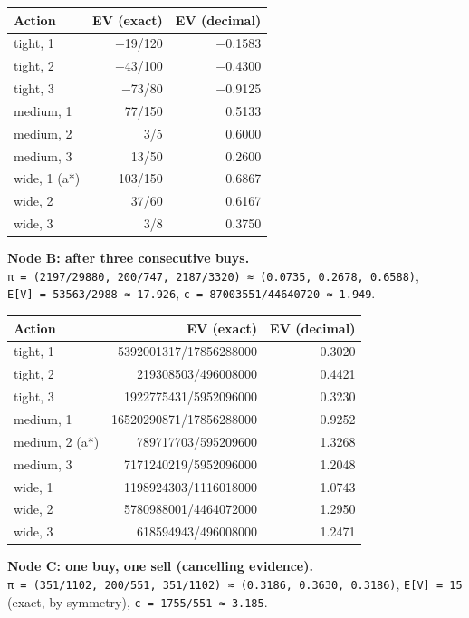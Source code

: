 \documentclass[
  11pt,
]{article}
\newcounter{none} %
\begin{document}
{\def\LTcaptype{none} %
\begin{longtable}[]{@{}lrr@{}}
\toprule\noalign{}
Action & EV (exact) & EV (decimal) \\
\midrule\noalign{}
\endhead
\bottomrule\noalign{}
\endlastfoot
tight, 1 & −19/120 & −0.1583 \\
tight, 2 & −43/100 & −0.4300 \\
tight, 3 & −73/80 & −0.9125 \\
medium, 1 & 77/150 & 0.5133 \\
medium, 2 & 3/5 & 0.6000 \\
medium, 3 & 13/50 & 0.2600 \\
wide, 1 (a*) & 103/150 & 0.6867 \\
wide, 2 & 37/60 & 0.6167 \\
wide, 3 & 3/8 & 0.3750 \\
\end{longtable}
}

\textbf{Node B: after three consecutive buys.} \texttt{π\ =\ (2197/29880,\ 200/747,\ 2187/3320)\ ≈\ (0.0735,\ 0.2678,\ 0.6588)}, \texttt{E{[}V{]}\ =\ 53563/2988\ ≈\ 17.926}, \texttt{c\ =\ 87003551/44640720\ ≈\ 1.949}.

{\def\LTcaptype{none} %
\begin{longtable}[]{@{}lrr@{}}
\toprule\noalign{}
Action & EV (exact) & EV (decimal) \\
\midrule\noalign{}
\endhead
\bottomrule\noalign{}
\endlastfoot
tight, 1 & 5392001317/17856288000 & 0.3020 \\
tight, 2 & 219308503/496008000 & 0.4421 \\
tight, 3 & 1922775431/5952096000 & 0.3230 \\
medium, 1 & 16520290871/17856288000 & 0.9252 \\
medium, 2 (a*) & 789717703/595209600 & 1.3268 \\
medium, 3 & 7171240219/5952096000 & 1.2048 \\
wide, 1 & 1198924303/1116018000 & 1.0743 \\
wide, 2 & 5780988001/4464072000 & 1.2950 \\
wide, 3 & 618594943/496008000 & 1.2471 \\
\end{longtable}
}

\textbf{Node C: one buy, one sell (cancelling evidence).} \texttt{π\ =\ (351/1102,\ 200/551,\ 351/1102)\ ≈\ (0.3186,\ 0.3630,\ 0.3186)}, \texttt{E{[}V{]}\ =\ 15} (exact, by symmetry), \texttt{c\ =\ 1755/551\ ≈\ 3.185}.
\end{document}
